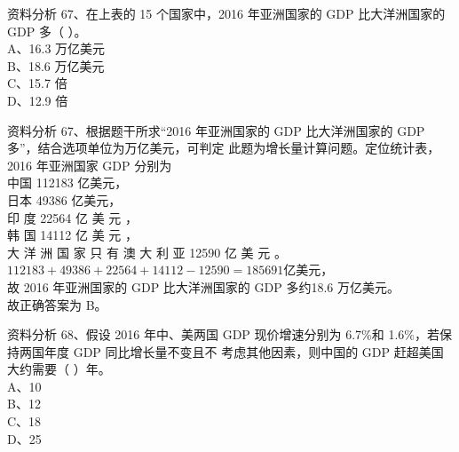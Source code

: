 \documentclass[aspectratio=169]{beamer}
\begin{document}
\begin{frame}[t]{资料分析}
    67、在上表的 15 个国家中，2016 年亚洲国家的 GDP 比大洋洲国家的 GDP 多（ ）。\\
    A、16.3 万亿美元                                                            \\
    B、18.6 万亿美元                                                            \\
    C、15.7 倍                                                                  \\
    D、12.9 倍                                                                  \\
\end{frame}                           


\begin{frame}[t]{资料分析}
    67、根据题干所求“2016 年亚洲国家的 GDP 比大洋洲国家的 GDP 多”，结合选项单位为万亿美元，可判定
    此题为增长量计算问题。定位统计表，\\
    2016 年亚洲国家 GDP 分别为\\
    中国 112183 亿美元，\\
    日本 49386 亿美元，\\
    印 度 22564 亿 美 元 ，\\
    韩 国 14112 亿 美 元 ，\\
    大 洋 洲 国 家 只 有 澳 大 利 亚 12590 亿 美 元 。\\
    $112183 +49386+ 22564 + 14112 - 12590 = 185691$亿美元，\\
    故 2016 年亚洲国家的 GDP 比大洋洲国家的 GDP 多约18.6 万亿美元。\\
    故正确答案为 B。\\
\end{frame}                           





\begin{frame}[t]{资料分析}
    68、假设 2016 年中、美两国 GDP 现价增速分别为 6.7\%和 1.6\%，若保持两国年度 GDP 同比增长量不变且不
    考虑其他因素，则中国的 GDP 赶超美国大约需要（ ）年。\\
    A、10                                               \\
    B、12                                               \\
    C、18                                               \\
    D、25                                               \\
\end{frame}                           
\end{document}
